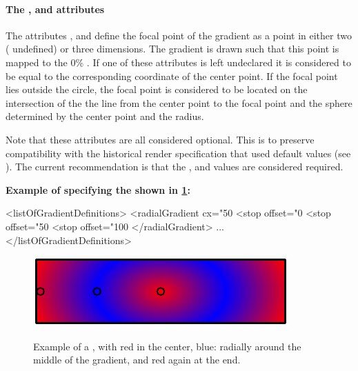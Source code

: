 \paragraph{The \fixttspace{}, \fixttspace{} and \fixttspace{} attributes}

The attributes ,  and  define the focal point of the gradient as a point in either two ( undefined) or three dimensions. The gradient is drawn such that this point is mapped to the 0\% \GradientStop. If one of these attributes is left undeclared it is considered to be equal to the corresponding coordinate of the center point. If the focal point lies outside 
the circle, the focal point is considered to be located on the intersection of the the line from the center
point to the focal point and the sphere determined by the center point and the radius.

Note that these attributes are all considered optional. This is to preserve compatibility with the historical render specification that used default values (see ). The current recommendation is that the ,  and  values are considered required.

  {\bf
Example of specifying the \RadialGradient shown in \ref{fig:radgrad}:
}

{\footnotesize
\begin{example}
<listOfGradientDefinitions>
  <radialGradient cx="50%
    <stop offset="0%
    <stop offset="50%
    <stop offset="100%
  </radialGradient>
       ...
</listOfGradientDefinitions>
\end{example}
}

\begin{figure}[!ht]
  \centering
  \includegraphics{figures/radgrad01.pdf}\\
  \caption{Example of a \RadialGradient, with red in the center, blue: radially around the middle of the gradient, and red again at the end.}
  \label{fig:radgrad}
\end{figure}




